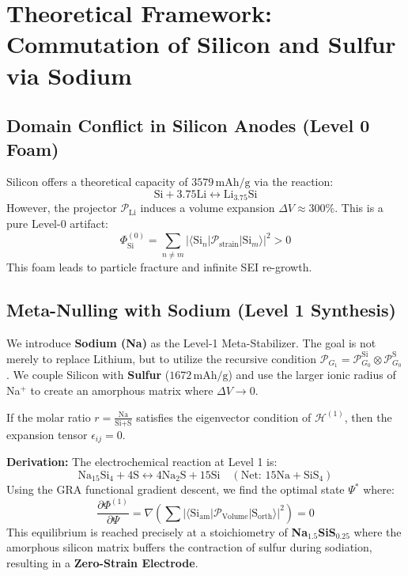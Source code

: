 \documentclass[12pt,a4paper]{article}
\begin{document}
\section{Theoretical Framework: Commutation of Silicon and Sulfur via Sodium}

\subsection{Domain Conflict in Silicon Anodes (Level 0 Foam)}
Silicon offers a theoretical capacity of \( 3579 \, \text{mAh/g} \) via the reaction:
\begin{equation}
\text{Si} + 3.75 \text{Li} \leftrightarrow \text{Li}_{3.75}\text{Si}
\end{equation}
However, the projector \( \mathcal{P}_{\text{Li}} \) induces a volume expansion \( \Delta V \approx 300\% \). This is a pure Level-0 artifact:
\begin{equation}
\Phi^{(0)}_{\text{Si}} = \sum_{n \neq m} \big| \langle \text{Si}_n | \mathcal{P}_{\text{strain}} | \text{Si}_m \rangle \big|^2 > 0
\end{equation}
This foam leads to particle fracture and infinite SEI re-growth.

\subsection{Meta-Nulling with Sodium (Level 1 Synthesis)}
We introduce \textbf{Sodium (Na)} as the Level-1 Meta-Stabilizer. The goal is not merely to replace Lithium, but to utilize the recursive condition \( \mathcal{P}_{G_1} = \mathcal{P}_{G_0}^{\text{Si}} \otimes \mathcal{P}_{G_0}^{\text{S}} \).
We couple Silicon with \textbf{Sulfur} (\( 1672 \, \text{mAh/g} \)) and use the larger ionic radius of Na\(^+\) to create an amorphous matrix where \( \Delta V \to 0 \).

\begin{theorem}
If the molar ratio \( r = \frac{\text{Na}}{\text{Si}+\text{S}} \) satisfies the eigenvector condition of \( \mathcal{H}^{(1)} \), then the expansion tensor \( \epsilon_{ij} = 0 \).
\end{theorem}

\textbf{Derivation:}
The electrochemical reaction at Level 1 is:
\begin{equation}
\text{Na}_{15}\text{Si}_4 + 4\text{S} \leftrightarrow 4\text{Na}_2\text{S} + 15\text{Si} \quad (\text{Net: } 15\text{Na} + \text{SiS}_4)
\end{equation}
Using the GRA functional gradient descent, we find the optimal state \( \Psi^* \) where:
\begin{equation}
\frac{\partial \Phi^{(1)}}{\partial \Psi} = \nabla \left( \sum \big| \langle \text{Si}_{\text{am}} | \mathcal{P}_{\text{Volume}} | \text{S}_{\text{orth}} \rangle \big|^2 \right) = 0
\end{equation}
This equilibrium is reached precisely at a stoichiometry of \textbf{Na\(_{1.5}\)SiS\(_{0.25}\)} where the amorphous silicon matrix buffers the contraction of sulfur during sodiation, resulting in a \textbf{Zero-Strain Electrode}.
\end{document}
